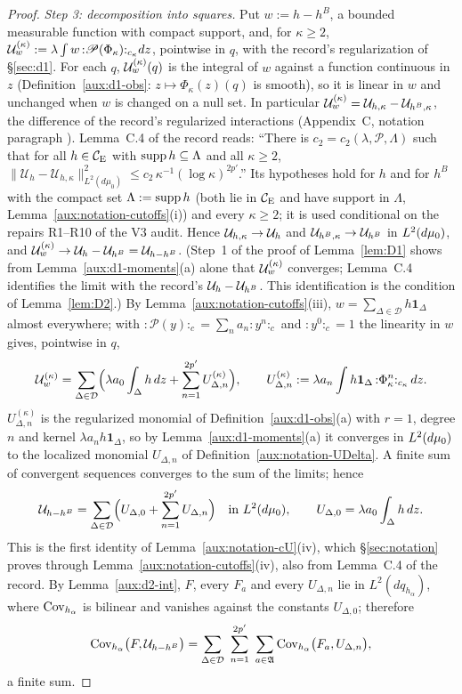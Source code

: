 \begin{proof}
\emph{Step 3: decomposition into squares.}  Put $w:=h-h^B$, a bounded measurable function with
compact support, and, for $\kappa\ge2$, $\mathcal U^{(\kappa)}_w:=\lambda\int w\,{:}\mathscr
P(\Phi_\kappa){:}_{c_\kappa}dz$, pointwise in $q$, with the record's regularization of
\S\ref{sec:d1}.  For each $q$, $\mathcal U^{(\kappa)}_w(q)$ is the integral of $w$ against a function
continuous in $z$ (Definition~\ref{aux:d1-obs}: $z\mapsto\Phi_\kappa(z)(q)$ is smooth), so it is
linear in $w$ and unchanged when $w$ is changed on a null set.  In particular
$\mathcal U^{(\kappa)}_w=\mathcal U_{h,\kappa}-\mathcal U_{h^B,\kappa}$, the difference of the record's regularized
interactions (Appendix~C, notation paragraph \cite[p.~39]{R}).  Lemma~C.4 of the record
\cite[p.~40]{R} reads: ``There is $c_2=c_2(\lambda,\mathscr P,\Lambda)$ such that for all
$h\in\mathcal{C}_{\mathrm E}$ with $\operatorname{supp} h\subseteq\Lambda$ and all $\kappa\ge2$,
$\|\mathcal U_h-\mathcal U_{h,\kappa}\|_{L^2(d\mu_0)}^2\le c_2\,\kappa^{-1}(\log\kappa)^{2p'}$.''
Its hypotheses hold for $h$ and for $h^B$ with the compact set $\Lambda:=\operatorname{supp} h$ (both lie in
$\mathcal{C}_{\mathrm E}$ and have support in $\Lambda$, Lemma~\ref{aux:notation-cutoffs}(i)) and every $\kappa\ge2$;
it is used conditional on the repairs R1--R10 of the V3 audit.  Hence $\mathcal U_{h,\kappa}\to\mathcal U_h$ and
$\mathcal U_{h^B,\kappa}\to\mathcal U_{h^B}$ in $L^2(d\mu_0)$, and
$\mathcal U^{(\kappa)}_w\to\mathcal U_h-\mathcal U_{h^B}=\mathcal U_{h-h^B}$.  (Step~1 of the proof of Lemma~\ref{lem:D1}
shows from Lemma~\ref{aux:d1-moments}(a) alone that $\mathcal U^{(\kappa)}_w$ converges; Lemma~C.4
identifies the limit with the record's $\mathcal U_h-\mathcal U_{h^B}$.  This identification is the condition
of Lemma~\ref{lem:D2}.)  By Lemma~\ref{aux:notation-cutoffs}(iii),
$w=\sum_{\Delta\in\mathcal D}h\mathbf 1_\Delta$ almost everywhere; with
${:}\mathscr P(y){:}_c=\sum_na_n{:}y^n{:}_c$ and ${:}y^0{:}_c=1$ the linearity in $w$ gives,
pointwise in $q$,
\[
 \mathcal U^{(\kappa)}_w=\sum_{\Delta\in\mathcal D}\Bigl(\lambda a_0\int_\Delta h\,dz
 +\sum_{n=1}^{2p'}U^{(\kappa)}_{\Delta,n}\Bigr),\qquad
 U^{(\kappa)}_{\Delta,n}:=\lambda a_n\int h\mathbf 1_\Delta\,{:}\Phi_\kappa^n{:}_{c_\kappa}\,dz .
\]
$U^{(\kappa)}_{\Delta,n}$ is the regularized monomial of Definition~\ref{aux:d1-obs}(a) with $r=1$,
degree $n$ and kernel $\lambda a_nh\mathbf 1_\Delta$, so by Lemma~\ref{aux:d1-moments}(a) it
converges in $L^2(d\mu_0)$ to the localized monomial $U_{\Delta,n}$ of
Definition~\ref{aux:notation-UDelta}.  A finite sum of convergent sequences converges to the sum
of the limits; hence
\[
 \mathcal U_{h-h^B}=\sum_{\Delta\in\mathcal D}\Bigl(U_{\Delta,0}+\sum_{n=1}^{2p'}U_{\Delta,n}\Bigr)
 \quad\text{in }L^2(d\mu_0),\qquad U_{\Delta,0}=\lambda a_0\int_\Delta h\,dz .
\]
This is the first identity of Lemma~\ref{aux:notation-cU}(iv), which \S\ref{sec:notation} proves
through Lemma~\ref{aux:notation-cutoffs}(iv), also from Lemma~C.4 of the record.  By
Lemma~\ref{aux:d2-int}, $F$, every
$F_a$ and every $U_{\Delta,n}$ lie in $L^2(dq_{h_\alpha})$, where $\operatorname{Cov}_{h_\alpha}$ is bilinear
and vanishes against the constants $U_{\Delta,0}$; therefore
\[
 \operatorname{Cov}_{h_\alpha}\bigl(F,\mathcal U_{h-h^B}\bigr)
 =\sum_{\Delta\in\mathcal D}\ \sum_{n=1}^{2p'}\ \sum_{a\in\mathfrak A}
  \operatorname{Cov}_{h_\alpha}\bigl(F_a,U_{\Delta,n}\bigr),
\]
a finite sum.


\end{proof}

